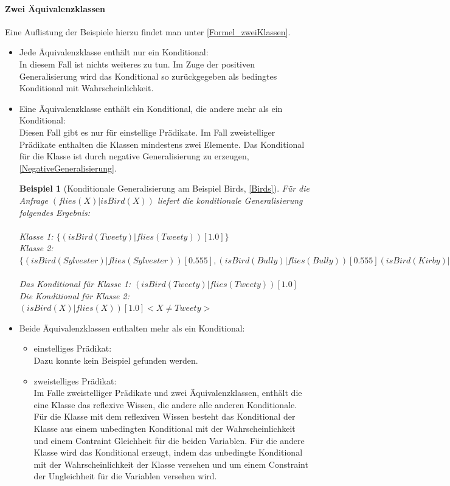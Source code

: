 \documentclass[a4paper, 11pt]{book}
\newtheorem{Bsp}{Beispiel}[section]
\begin{document}
{\paragraph{Zwei Äquivalenzklassen}
Eine Auflistung der Beispiele hierzu findet man unter \ref{Formel_zweiKlassen}.
\begin{itemize}
	\item Jede Äquivalenzklasse enthält nur ein Konditional:\\
	In diesem Fall ist nichts weiteres zu tun. Im Zuge der positiven Generalisierung wird das Konditional so zurückgegeben als bedingtes Konditional mit Wahrscheinlichkeit.
	\item Eine Äquivalenzklasse enthält ein Konditional, die andere mehr als ein Konditional:\\
	Diesen Fall gibt es nur für einstellige Prädikate. Im Fall zweistelliger Prädikate enthalten die Klassen mindestens zwei Elemente. Das Konditional für die Klasse ist durch negative Generalisierung zu erzeugen, \ref{NegativeGeneralisierung}. 
	\begin{Bsp}[Konditionale Generalisierung am Beispiel Birds, \ref{Birds}]
	Für die Anfrage $ (flies(X) | isBird(X)) $ liefert die konditionale Generalisierung folgendes Ergebnis:\\
	\\
	Klasse 1: $ \{(isBird(Tweety)|flies(Tweety))[1.0]\} $\\
	Klasse 2: $ \{(isBird(Sylvester)|flies(Sylvester))[0.555], (isBird(Bully)|flies(Bully))[0.555] (isBird(Kirby)|flies(Kirby))[0.555] \}  $\\
	\\
	Das Konditional für Klasse 1: $ (isBird(Tweety)|flies(Tweety))[1.0]$\\
	Die Konditional für Klasse 2: $ (isBird(X)|flies(X))[1.0] <X \neq Tweety>$\\
	\end{Bsp}
	\item Beide Äquivalenzklassen enthalten mehr als ein Konditional:\\
	\begin{itemize}
		\item einstelliges Prädikat:\\
		Dazu konnte kein Beispiel gefunden werden.
		\item zweistelliges Prädikat:\\
		Im Falle zweistelliger Prädikate und zwei Äquivalenzklassen, enthält die eine Klasse das reflexive Wissen, die andere alle anderen Konditionale. Für die Klasse mit dem reflexiven Wissen besteht das Konditional der Klasse aus einem unbedingten Konditional mit der Wahrscheinlichkeit und einem Contraint Gleichheit für die beiden Variablen. Für die andere Klasse wird das Konditional erzeugt, indem das unbedingte Konditional mit der Wahrscheinlichkeit der Klasse versehen und um einem Constraint der Ungleichheit für die Variablen versehen wird.

\end{itemize}
\end{itemize}}
\end{document}
